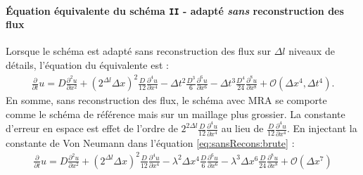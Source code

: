 \paragraph{Équation équivalente du schéma \texttt{II} - adapté \emph{sans} reconstruction des flux}
    Lorsque le schéma est adapté sans reconstruction des flux sur $\Delta l$ niveaux de détails,
    l'équation du équivalente est :
    \begin{align}\label{eq:sansRecons:brute}
        \frac{\partial}{\partial t} u=
            D \frac{\partial^{2}u}{\partial x^{2}}
            + (2^{\Delta l} \Delta x)^{2}  \frac{D}{12} \frac{\partial^{4}u}{\partial x^{4}}
            -\Delta t^{2} \frac{D^{3}}{6}   \frac{\partial^{6}u}{\partial x^{6}}
            -\Delta t^{3} \frac{D^{4} }{24} \frac{\partial^{8}u}{\partial x^{8}}
            + \mathcal{O}(\Delta x^4 , \Delta t^4).
    \end{align}
    En somme, sans reconstruction des flux, le schéma avec MRA se comporte comme le schéma de référence mais sur un maillage plus grossier. 
    La constante d'erreur en espace est effet de l'ordre de $2^{2\Delta l} \frac{D}{12} \frac{\partial^{4}u}{\partial x^{4}}$ 
    au lieu de $\frac{D}{12}\frac{\partial^{4}u}{\partial x^{4}}$.
    En injectant la constante de Von Neumann dans l'équation \eqref{eq:sansRecons:brute} :
    \begin{align}\label{eq:sansRecons:cfl}
        \frac{\partial}{\partial t} u=
            D \frac{\partial^{2}u}{\partial x^{2}}
            + (2^{\Delta l} \Delta x)^{2}  \frac{D}{12} \frac{\partial^{4}u}{\partial x^{4}}
            -\lambda^2 \Delta x^{4} \frac{D}{6}   \frac{\partial^{6}u}{\partial x^{6}}
            -\lambda^3 \Delta x^{6} \frac{D}{24} \frac{\partial^{8}u}{\partial x^{8}} + \mathcal{O}(\Delta x^7)
    \end{align}
